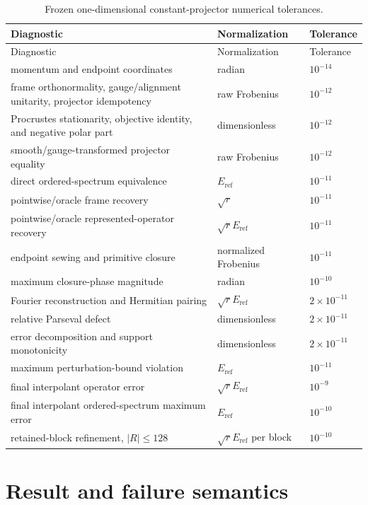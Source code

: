 \documentclass[11pt]{article}
\newcommand{\Eref}{E_{\mathrm{ref}}}
\begin{document}
{\small
\begin{longtable}{@{}>{\raggedright\arraybackslash}p{}
                         >{\raggedright\arraybackslash}p{}
                         >{\raggedleft\arraybackslash}p{}@{}}
\caption{Frozen one-dimensional constant-projector numerical tolerances.}
\label{tab:tolerances}\\
\toprule
Diagnostic & Normalization & Tolerance \\
\midrule
\endfirsthead
\toprule
Diagnostic & Normalization & Tolerance \\
\midrule
\endhead
momentum and endpoint coordinates & radian & $10^{-14}$ \\
frame orthonormality, gauge/alignment unitarity, projector idempotency & raw Frobenius & $10^{-12}$ \\
Procrustes stationarity, objective identity, and negative polar part & dimensionless & $10^{-12}$ \\
smooth/gauge-transformed projector equality & raw Frobenius & $10^{-12}$ \\
direct ordered-spectrum equivalence & $\Eref$ & $10^{-11}$ \\
pointwise/oracle frame recovery & $\sqrt r$ & $10^{-11}$ \\
pointwise/oracle represented-operator recovery & $\sqrt r\Eref$ & $10^{-11}$ \\
endpoint sewing and primitive closure & normalized Frobenius & $10^{-11}$ \\
maximum closure-phase magnitude & radian & $10^{-10}$ \\
Fourier reconstruction and Hermitian pairing & $\sqrt r\Eref$ & $2\times10^{-11}$ \\
relative Parseval defect & dimensionless & $2\times10^{-11}$ \\
error decomposition and support monotonicity & dimensionless & $2\times10^{-11}$ \\
maximum perturbation-bound violation & $\Eref$ & $10^{-11}$ \\
final interpolant operator error & $\sqrt r\Eref$ & $10^{-9}$ \\
final interpolant ordered-spectrum maximum error & $\Eref$ & $10^{-10}$ \\
retained-block refinement, $|R|\leq128$ & $\sqrt r\Eref$ per block & $10^{-10}$ \\
\bottomrule
\end{longtable}
}

\section{Result and failure semantics}
\label{app:failures}
\end{document}

